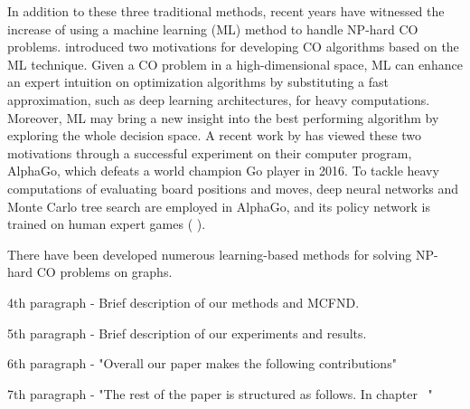 In addition to these three traditional methods, recent years have witnessed the increase of using a machine learning (ML) method to handle NP-hard CO problems. \citeauthor{bengio2018machine} \cite{bengio2018machine} introduced two motivations for developing CO algorithms based on the ML technique. Given a CO problem in a high-dimensional space, ML can enhance an expert intuition on optimization algorithms by substituting a fast approximation, such as deep learning architectures, for heavy computations. Moreover, ML may bring a new insight into the best performing algorithm by exploring the whole decision space. A recent work by \citeauthor{silver2017mastering} \cite{silver2017mastering} has viewed these two motivations through a successful experiment on their computer program, AlphaGo, which defeats a world champion Go player in 2016. To tackle heavy computations of evaluating board positions and moves, deep neural networks and Monte Carlo tree search are employed in AlphaGo, and its policy network is trained on human expert games (\citeauthor{silver2016mastering} \cite{silver2016mastering}).

There have been developed numerous learning-based methods for solving NP-hard CO problems on graphs.

4th paragraph - Brief description of our methods and MCFND.

5th paragraph - Brief description of our experiments and results.

6th paragraph - "Overall our paper makes the following contributions"

7th paragraph - "The rest of the paper is structured as follows. In chapter ~"
